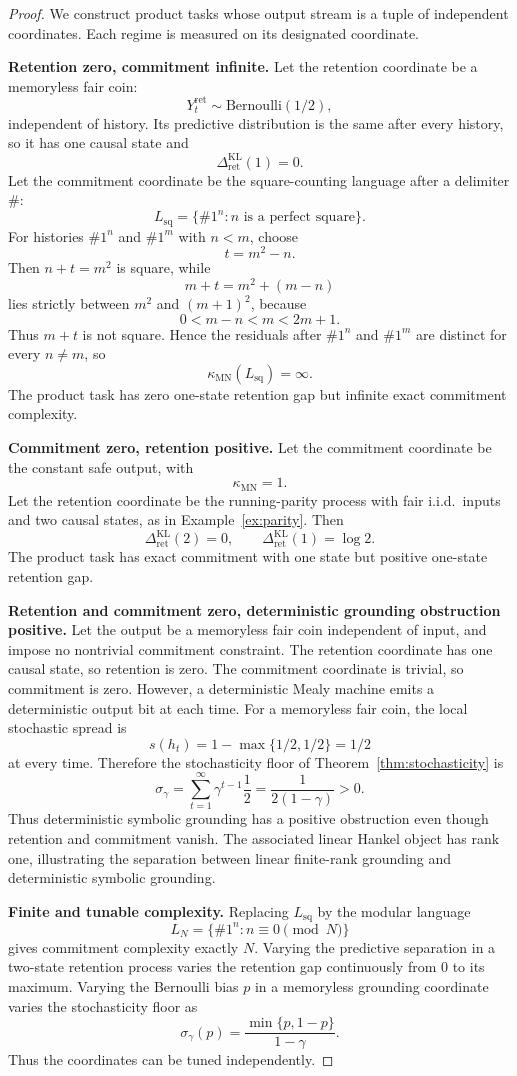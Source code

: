 \documentclass[12pt]{article}
\theoremstyle{definition}
\newcommand{\RetKL}{\Delta_{\mathrm{ret}}^{\mathrm{KL}}}
\newcommand{\kappaMN}{\kappa_{\mathrm{MN}}}
\begin{document}
\begin{proof}
We construct product tasks whose output stream is a tuple of independent
coordinates.  Each regime is measured on its designated coordinate.

\medskip
\noindent\textbf{Retention zero, commitment infinite.}
Let the retention coordinate be a memoryless fair coin:
\[
Y_t^{\mathrm{ret}}\sim\mathrm{Bernoulli}(1/2),
\]
independent of history.  Its predictive distribution is the same after every
history, so it has one causal state and
\[
\RetKL(1)=0.
\]
Let the commitment coordinate be the square-counting language after a delimiter
$\#$:
\[
L_{\mathrm{sq}}
=
\{
\#1^n : n \text{ is a perfect square}
\}.
\]
For histories $\#1^n$ and $\#1^m$ with $n<m$, choose
\[
t=m^2-n.
\]
Then $n+t=m^2$ is square, while
\[
m+t=m^2+(m-n)
\]
lies strictly between $m^2$ and $(m+1)^2$, because
\[
0<m-n<m<2m+1.
\]
Thus $m+t$ is not square.  Hence the residuals after $\#1^n$ and $\#1^m$ are
distinct for every $n\neq m$, so
\[
\kappaMN(L_{\mathrm{sq}})=\infty.
\]
The product task has zero one-state retention gap but infinite exact
commitment complexity.

\medskip
\noindent\textbf{Commitment zero, retention positive.}
Let the commitment coordinate be the constant safe output, with
\[
\kappaMN=1.
\]
Let the retention coordinate be the running-parity process with fair i.i.d.\
inputs and two causal states, as in Example~\ref{ex:parity}.  Then
\[
\RetKL(2)=0,
\qquad
\RetKL(1)=\log 2.
\]
The product task has exact commitment with one state but positive one-state
retention gap.

\medskip
\noindent\textbf{Retention and commitment zero, deterministic grounding
obstruction positive.}
Let the output be a memoryless fair coin independent of input, and impose no
nontrivial commitment constraint.  The retention coordinate has one causal
state, so retention is zero.  The commitment coordinate is trivial, so
commitment is zero.  However, a deterministic Mealy machine emits a
deterministic output bit at each time.  For a memoryless fair coin, the local
stochastic spread is
\[
s(h_t)=1-\max\{1/2,1/2\}=1/2
\]
at every time.  Therefore the stochasticity floor of
Theorem~\ref{thm:stochasticity} is
\[
\sigma_\gamma
=
\sum_{t=1}^\infty
\gamma^{t-1}\frac12
=
\frac{1}{2(1-\gamma)}
>0.
\]
Thus deterministic symbolic grounding has a positive obstruction even though
retention and commitment vanish.  The associated linear Hankel object has rank
one, illustrating the separation between linear finite-rank grounding and
deterministic symbolic grounding.

\medskip
\noindent\textbf{Finite and tunable complexity.}
Replacing $L_{\mathrm{sq}}$ by the modular language
\[
L_N=\{\#1^n:n\equiv0\pmod N\}
\]
gives commitment complexity exactly $N$.  Varying the predictive separation in
a two-state retention process varies the retention gap continuously from $0$
to its maximum.  Varying the Bernoulli bias $p$ in a memoryless grounding
coordinate varies the stochasticity floor as
\[
\sigma_\gamma(p)
=
\frac{\min\{p,1-p\}}{1-\gamma}.
\]
Thus the coordinates can be tuned independently.
\end{proof}
\end{document}
